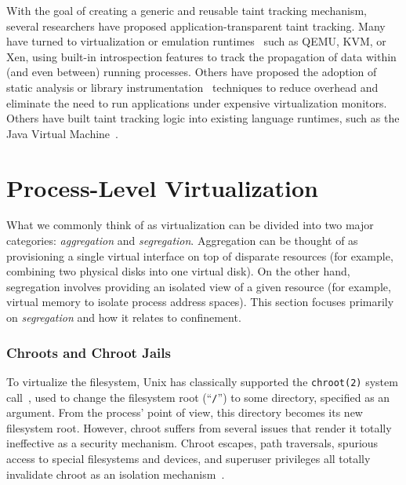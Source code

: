 With the goal of creating a generic and reusable taint tracking mechanism, several
researchers have proposed application-transparent taint tracking. Many have turned to
virtualization or emulation runtimes~\cite{ermolinskiy2010_towards, zavou2011_taint,
yin2007_panorama} such as QEMU, KVM, or Xen, using built-in introspection features to
track the propagation of data within (and even between) running processes. Others have
proposed the adoption of static analysis or library
instrumentation~\cite{zhu2011_taint_eraser, cheng2006_taint, clause2007_taint} techniques
to reduce overhead and eliminate the need to run applications under expensive
virtualization monitors. Others have built taint tracking logic into existing language
runtimes, such as the Java Virtual Machine~\cite{chin2009_efficient}.



\section{Process-Level Virtualization}%
\label{s:virtualization}


What we commonly think of as virtualization can be divided into two major categories:
\textit{aggregation} and \textit{segregation}. Aggregation can be thought of as
provisioning a single virtual interface on top of disparate resources (for example,
combining two physical disks into one virtual disk). On the other hand, segregation
involves providing an isolated view of a given resource (for example, virtual memory to
isolate process address spaces). This section focuses primarily on \textit{segregation}
and how it relates to confinement.

\subsubsection*{Chroots and Chroot Jails}

To virtualize the filesystem, Unix has classically supported the \texttt{chroot(2)} system
call~\cite{mcfearin2011_chroot_jails}, used to change the filesystem root (\enquote{\texttt{/}})
to some directory, specified as an argument. From the process' point of view, this
directory becomes its new filesystem root. However, chroot suffers from several issues
that render it totally ineffective as a security mechanism. Chroot escapes, path
traversals, spurious access to special filesystems and devices, and superuser privileges
all totally invalidate chroot as an isolation mechanism~\cite{mcfearin2011_chroot_jails}.

